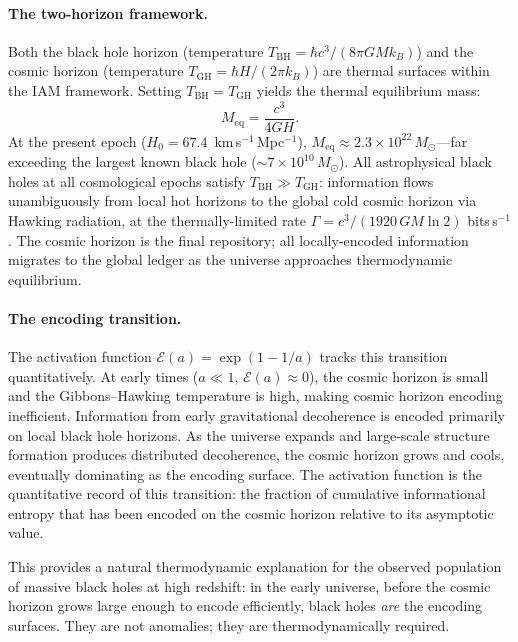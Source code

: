 \documentclass[11pt]{article}
\begin{document}
\paragraph{The two-horizon framework.}
Both the black hole horizon (temperature $T_\mathrm{BH}
= \hbar c^3/(8\pi GMk_B)$) and the cosmic horizon (temperature
$T_\mathrm{GH} = \hbar H/(2\pi k_B)$) are thermal surfaces within
the IAM framework.  Setting $T_\mathrm{BH} = T_\mathrm{GH}$ yields the
thermal equilibrium mass:
\begin{equation}
M_\mathrm{eq} = \frac{c^3}{4GH}.
\label{eq:Meq}
\end{equation}
At the present epoch ($H_0 = 67.4$~km\,s$^{-1}$\,Mpc$^{-1}$),
$M_\mathrm{eq} \approx 2.3\times 10^{22}\,M_\odot$---far exceeding the
largest known black hole (${\sim}7\times 10^{10}\,M_\odot$).  All
astrophysical black holes at all cosmological epochs satisfy
$T_\mathrm{BH} \gg T_\mathrm{GH}$: information flows unambiguously from
local hot horizons to the global cold cosmic horizon via Hawking
radiation, at the thermally-limited rate
$\Gamma = c^3/(1920\,GM\ln 2)$ bits\,s$^{-1}$.  The cosmic horizon is
the final repository; all locally-encoded information migrates to the
global ledger as the universe approaches thermodynamic equilibrium.

\paragraph{The encoding transition.}
The activation function $\mathcal{E}(a) = \exp(1-1/a)$ tracks this
transition quantitatively.  At early times ($a \ll 1$,
$\mathcal{E}(a) \approx 0$), the cosmic horizon is small and the
Gibbons--Hawking temperature is high, making cosmic horizon encoding
inefficient.  Information from early gravitational decoherence is
encoded primarily on local black hole horizons.  As the universe expands
and large-scale structure formation produces distributed decoherence,
the cosmic horizon grows and cools, eventually dominating as the
encoding surface.  The activation function is the quantitative record of
this transition: the fraction of cumulative informational entropy that
has been encoded on the cosmic horizon relative to its asymptotic value.

This provides a natural thermodynamic explanation for the observed
population of massive black holes at high redshift: in the early
universe, before the cosmic horizon grows large enough to encode
efficiently, black holes \textit{are} the encoding surfaces.  They are
not anomalies; they are thermodynamically required.
\end{document}
